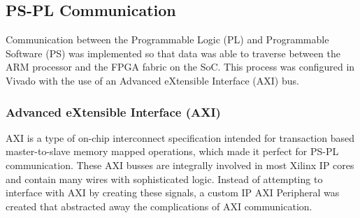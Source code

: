 \subsection{PS-PL Communication} \label{ssec:ps_pl}
Communication between the Programmable Logic (PL) and Programmable Software (PS) was implemented so that data was able to traverse between the ARM processor and the FPGA fabric on the SoC. This process was configured in Vivado with the use of an Advanced eXtensible Interface (AXI) bus.

\subsubsection{Advanced eXtensible Interface (AXI)}
AXI is a type of on-chip interconnect specification intended for transaction based master-to-slave memory mapped operations, which made it perfect for PS-PL communication. These AXI busses are integrally involved in most Xilinx IP cores and contain many wires with sophisticated logic. Instead of attempting to interface with AXI by creating these signals, a custom IP AXI Peripheral was created that abstracted away the complications of AXI communication.

